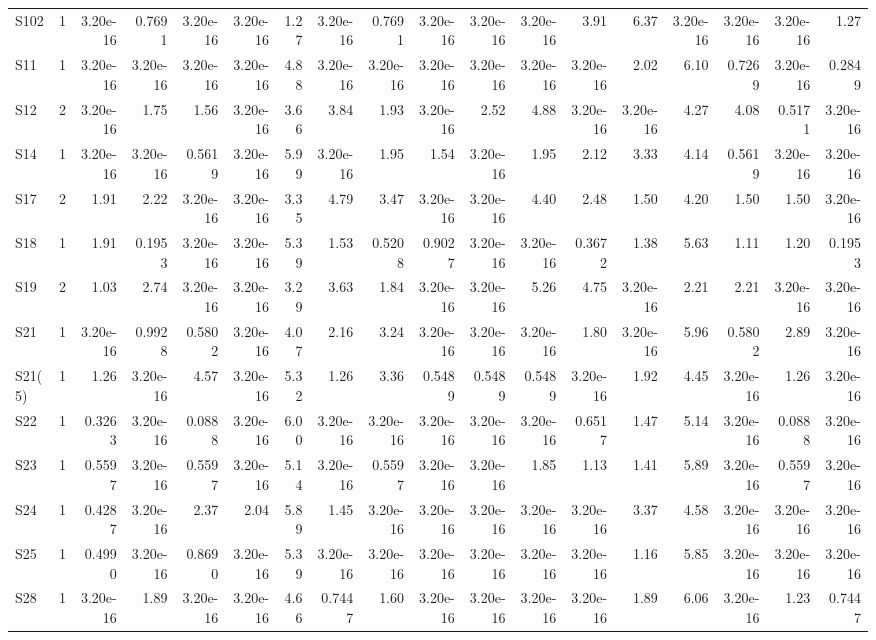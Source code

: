 {\begin{longtable}{lrrrrrrrrrrrrrrrrr}
  S102 & 1 & 3.20e-16 & 0.7691 & 3.20e-16 & 3.20e-16 & 1.27 & 3.20e-16 & 0.7691 & 3.20e-16 & 3.20e-16 & 3.20e-16 & 3.91 & 6.37 & 3.20e-16 & 3.20e-16 & 3.20e-16 & 1.27 \\
  S11 & 1 & 3.20e-16 & 3.20e-16 & 3.20e-16 & 3.20e-16 & 4.88 & 3.20e-16 & 3.20e-16 & 3.20e-16 & 3.20e-16 & 3.20e-16 & 3.20e-16 & 2.02 & 6.10 & 0.7269 & 3.20e-16 & 0.2849 \\
  S12 & 2 & 3.20e-16 & 1.75 & 1.56 & 3.20e-16 & 3.66 & 3.84 & 1.93 & 3.20e-16 & 2.52 & 4.88 & 3.20e-16 & 3.20e-16 & 4.27 & 4.08 & 0.5171 & 3.20e-16 \\
  S14 & 1 & 3.20e-16 & 3.20e-16 & 0.5619 & 3.20e-16 & 5.99 & 3.20e-16 & 1.95 & 1.54 & 3.20e-16 & 1.95 & 2.12 & 3.33 & 4.14 & 0.5619 & 3.20e-16 & 3.20e-16 \\
  S17 & 2 & 1.91 & 2.22 & 3.20e-16 & 3.20e-16 & 3.35 & 4.79 & 3.47 & 3.20e-16 & 3.20e-16 & 4.40 & 2.48 & 1.50 & 4.20 & 1.50 & 1.50 & 3.20e-16 \\
  S18 & 1 & 1.91 & 0.1953 & 3.20e-16 & 3.20e-16 & 5.39 & 1.53 & 0.5208 & 0.9027 & 3.20e-16 & 3.20e-16 & 0.3672 & 1.38 & 5.63 & 1.11 & 1.20 & 0.1953 \\
  S19 & 2 & 1.03 & 2.74 & 3.20e-16 & 3.20e-16 & 3.29 & 3.63 & 1.84 & 3.20e-16 & 3.20e-16 & 5.26 & 4.75 & 3.20e-16 & 2.21 & 2.21 & 3.20e-16 & 3.20e-16 \\
  S21 & 1 & 3.20e-16 & 0.9928 & 0.5802 & 3.20e-16 & 4.07 & 2.16 & 3.24 & 3.20e-16 & 3.20e-16 & 3.20e-16 & 1.80 & 3.20e-16 & 5.96 & 0.5802 & 2.89 & 3.20e-16 \\
  S21(5) & 1 & 1.26 & 3.20e-16 & 4.57 & 3.20e-16 & 5.32 & 1.26 & 3.36 & 0.5489 & 0.5489 & 0.5489 & 3.20e-16 & 1.92 & 4.45 & 3.20e-16 & 1.26 & 3.20e-16 \\
  S22 & 1 & 0.3263 & 3.20e-16 & 0.0888 & 3.20e-16 & 6.00 & 3.20e-16 & 3.20e-16 & 3.20e-16 & 3.20e-16 & 3.20e-16 & 0.6517 & 1.47 & 5.14 & 3.20e-16 & 0.0888 & 3.20e-16 \\
  S23 & 1 & 0.5597 & 3.20e-16 & 0.5597 & 3.20e-16 & 5.14 & 3.20e-16 & 0.5597 & 3.20e-16 & 3.20e-16 & 1.85 & 1.13 & 1.41 & 5.89 & 3.20e-16 & 0.5597 & 3.20e-16 \\
  S24 & 1 & 0.4287 & 3.20e-16 & 2.37 & 2.04 & 5.89 & 1.45 & 3.20e-16 & 3.20e-16 & 3.20e-16 & 3.20e-16 & 3.20e-16 & 3.37 & 4.58 & 3.20e-16 & 3.20e-16 & 3.20e-16 \\
  S25 & 1 & 0.4990 & 3.20e-16 & 0.8690 & 3.20e-16 & 5.39 & 3.20e-16 & 3.20e-16 & 3.20e-16 & 3.20e-16 & 3.20e-16 & 3.20e-16 & 1.16 & 5.85 & 3.20e-16 & 3.20e-16 & 3.20e-16 \\
  S28 & 1 & 3.20e-16 & 1.89 & 3.20e-16 & 3.20e-16 & 4.66 & 0.7447 & 1.60 & 3.20e-16 & 3.20e-16 & 3.20e-16 & 3.20e-16 & 1.89 & 6.06 & 3.20e-16 & 1.23 & 0.7447 \\

\end{longtable}}
